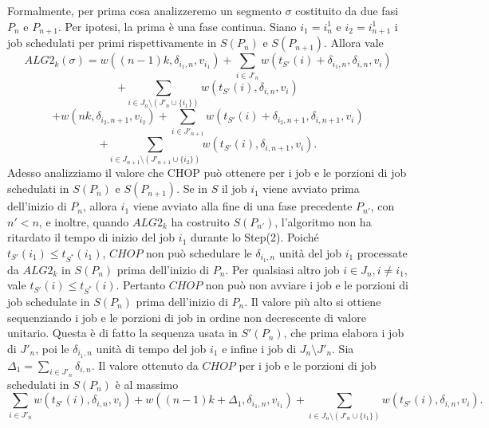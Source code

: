 \documentclass[twoside,openany,titlepage,fleqn,
	headinclude,12pt,a4paper,BCOR5mm,footinclude]{scrbook}
\begin{document}
Formalmente, per prima cosa analizzeremo un segmento $\sigma$ costituito da due fasi $P_{n}$ e $P_{n + 1}$.
Per ipotesi, la prima è una fase continua. Siano $i_{1} = i_{n}^{1}$ e $i_{2} = i_{n+1}^{1}$ i job schedulati per primi rispettivamente in $S(P_{n})$ e $S(P_{n + 1})$. Allora vale
\begin{equation}
ALG2_{k}(\sigma) = w ((n - 1)k, \delta_{i_{1},n}, v_{i_{1}}) + \sum_{i \in J'_{n}} w(t_{S'}(i) + \delta_{i_{1},n}, \delta_{i,n}, v_{i}) \tag*{(4)}
\end{equation}
$$+ \sum_{i \in J_{n} \setminus (J'_{n} \cup \{i_{1}\})} w (t_{S'} (i), \delta_{i,n}, v_{i})$$
\begin{equation}
+ w (nk, \delta_{i_{2}, n+1}, v_{i_{2}}) + \sum_{i \in J'_{n+1}} w(t_{S'} (i) + \delta_{i_{2}, n+1}, \delta_{i,n+1}, v_{i}) \tag*{(5)}
\end{equation}
$$+ \sum_{i \in J_{n+1} \setminus (J'_{n+1} \cup \{i_{2}\})} w (t_{S'} (i), \delta_{i,n+1}, v_{i}).$$
Adesso analizziamo il valore che CHOP può ottenere per i job e le porzioni di job schedulati in $S(P_{n})$ e $S(P_{n + 1})$. Se in $S$ il job $i_{1}$ viene avviato prima dell'inizio di $P_{n}$, allora $i_{1}$ viene avviato alla fine di una fase precedente $P_{n'}$, con $n' < n$, e inoltre, quando $ALG2_{k}$ ha costruito $S(P_{n'})$, l'algoritmo non ha ritardato il tempo di inizio del job $i_{1}$ durante lo Step(2). Poiché $t_{S'} (i_{1}) \leq t_{S^{*}}(i_{1})$, $CHOP$ non può schedulare le $\delta_{i_{1},n}$ unità del job $i_{1}$ processate da $ALG2_{k}$ in $S(P_{n})$ prima dell'inizio di $P_{n}$. Per qualsiasi altro job $i \in J_{n}, i \neq i_{1}$, vale $t_{S'}(i) \leq t_{S^{*}} (i)$. Pertanto $CHOP$ non può non avviare i job e le porzioni di job schedulate in $S(P_{n})$ prima dell'inizio di $P_{n}$. Il valore più alto si ottiene sequenziando i job e le porzioni di job in ordine non decrescente di valore unitario. Questa è di fatto la sequenza usata in $S'(P_{n})$, che prima elabora i job di $J'_{n}$, poi le  $\delta_{i_{1},n}$ unità di tempo del job $i_{1}$ e infine i job di $J_{n} \setminus J'_{n}$. Sia 
$\Delta_{1} = \sum_{i \in J'_{n}} \delta_{i,n}$. Il valore ottenuto da $CHOP$ per i job e le porzioni di job schedulati in $S(P_{n})$ è al massimo
$$ \sum_{i \in J'_{n}} w(t_{S'}(i), \delta_{i,n}, v_{i}) + w ((n - 1) k + \Delta_{1}, \delta_{i_{1},n}, v_{i_{1}}) + \sum_{i \in J_{n} \setminus (J'_{n}\cup \{i_{1}\})} w (t_{S'} (i), \delta_{i,n},v_{i}).$$
\end{document}
